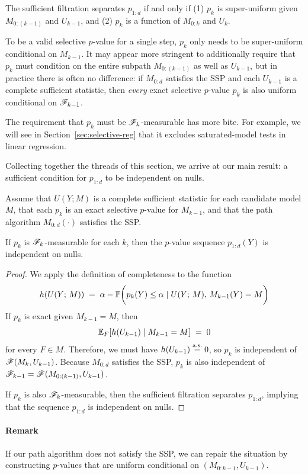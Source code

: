 \documentclass{article}
\begin{document}
The sufficient filtration separates $p_{1:d}$ if and only if (1) $p_k$ is super-uniform given $M_{0:(k-1)}$ and $U_{k-1}$, and (2) $p_k$ is a function of $M_{0:k}$ and $U_k$.

To be a valid selective $p$-value for a single step, $p_k$ only needs to be super-uniform conditional on $M_{k-1}$. It may appear more stringent to additionally require that $p_k$ must condition on the entire subpath $M_{0:(k-1)}$ as well as $U_{k-1}$, but in practice there is often no difference: if $M_{0:d}$ satisfies the SSP and each $U_{k-1}$ is a complete sufficient statistic, then {\em every} exact selective $p$-value $p_k$ is also uniform conditional on $\sF_{k-1}$.

The requirement that $p_k$ must be $\sF_k$-measurable has more bite. For example, we will see in Section~\ref{sec:selective-reg} that it excludes saturated-model tests in linear regression.

Collecting together the threads of this section, we arrive at our main result: a sufficient condition for $p_{1:d}$ to be independent on nulls.
\begin{theorem} \label{thm:suffCond}
Assume that $U(Y; M)$ is a complete sufficient statistic for each candidate model $M$, that each $p_k$ is an exact selective $p$-value for $M_{k-1}$, and that the path algorithm $M_{0:d}(\cdot)$ satisfies the SSP.

If $p_k$ is $\sF_k$-measurable for each $k$, then the $p$-value sequence $p_{1:d}(Y)$ is independent on nulls.
\end{theorem}

\begin{proof}
We apply the definition of completeness to the function 
\[
h(U(Y; \, M)) \;=\; 
\alpha - \P\bigg(p_k(Y) \leq \alpha \mid U(Y; \, M), \, M_{k-1}(Y) = M\bigg)
\]
If $p_k$ is exact given $M_{k-1} = M$, then 
\[
\E_F[h(U_{k-1}) \mid M_{k-1}=M] \;=\; 0
\] 
for every $F\in M$. Therefore, we must have $h(U_{k-1})\eqAS 0$, so $p_k$ is independent of $\sF(M_k, U_{k-1})$. Because $M_{0:d}$ satisfies the SSP, $p_k$ is also independent of $\sF_{k-1} = \sF(M_{0:(k-1)}, U_{k-1})$.

If $p_k$ is also $\sF_k$-measurable, then the sufficient filtration separates $p_{1:d}$, implying that the sequence $p_{1:d}$ is independent on nulls.
\end{proof}

\paragraph{Remark} If our path algorithm does not satisfy the SSP, we can repair the situation by constructing $p$-values that are uniform conditional on $(M_{0:k-1},U_{k-1})$.
\end{document}
